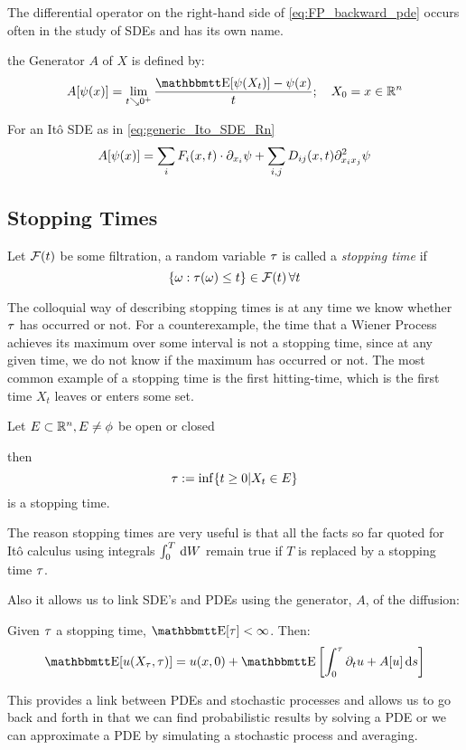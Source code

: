 The differential operator on the right-hand side of
\cref{eq:FP_backward_pde} occurs often in the study of SDEs and has its own
name.
\begin{defn} the Generator $A$ of $X$ is defined by:
$$
A[\psi(x)] = \lim_{t \searrow 0^+} \frac{\Exp[\psi(X_t)]  - \psi(x)}{t} ;  \quad X_0 =
x \in \R^n
$$
\end{defn} 
\begin{lemma} For an It\^o SDE as in \cref{eq:generic_Ito_SDE_Rn} 
$$
A[\psi(x)] = \sum_i F_i(x,t) \cdot {\partial}_{x_i} \psi + \sum_{i,j} D_{ij}(x,t)
{\partial}^2_{x_i x_j}\psi $$
\end{lemma}


\subsection{Stopping Times}
\begin{defn}
Let ${\mathcal{F}}(t)$ be some filtration, a random variable ${\tau}$ is called a
\emph{stopping time} if 
$$
\{{\omega} : {\tau}({\omega}) \leq t\} \in {\mathcal{F}}(t) \, \forall t  
$$
\end{defn}
The colloquial way of describing stopping times is at any time we know
whether ${\tau}$ has occurred or not. For a counterexample, the time that a Wiener
Process achieves its maximum over some interval is not a stopping time, since at any
given time, we do not know if the maximum has occurred or not. The most common
example of a stopping time is the first hitting-time, which is the first time
$X_t$ leaves or enters some set. 
\begin{thm} Let $E \subset { \mathbb{R} }^n, E \neq
\phi$ be open or closed
 
then $${\tau} := \inf\{ t \geq 0 | X_t \in E\}$$ is a stopping time.
\end{thm}
 
The reason stopping times are very useful is that all the facts so far quoted
for It\^o calculus using integrals $\int_0^T \, \mathrm{d} W$ remain true if $T$ is
replaced by a stopping time ${\tau}$.
 
Also it allows us to link SDE's and PDEs using the generator, $A$, of the
diffusion: 
\begin{thm} Given ${\tau}$ a stopping time, $\Exp[\t] < \infty$.
Then:
$$
\Exp[u(X_\t, \t)] =
u(x, 0) + \Exp\left[\int_0^\t \di_t u + A[u] \intd{s}
\right]
 $$
\end{thm}
This provides a link between PDEs and stochastic processes and allows us to go
back and forth in that we can find probabilistic results by
solving a PDE or we can approximate a PDE by simulating a stochastic process
and averaging.

